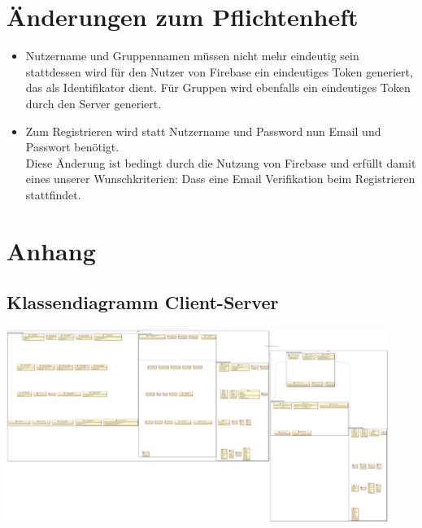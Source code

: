 \documentclass[a4paper]{scrreprt}
\begin{document}
\chapter{Änderungen zum Pflichtenheft}
\begin{itemize}
	\item Nutzername und Gruppennamen müssen nicht mehr eindeutig sein \\
	stattdessen wird für den Nutzer von Firebase ein eindeutiges Token generiert, das als Identifikator dient. Für Gruppen wird ebenfalls ein eindeutiges Token durch den Server generiert.
	\item Zum Registrieren wird statt Nutzername und Password nun Email und Passwort benötigt. \\Diese Änderung ist bedingt durch die Nutzung von Firebase und erfüllt damit eines unserer Wunschkriterien: Dass eine Email Verifikation beim Registrieren stattfindet. 
\end{itemize}

\printglossaries

\chapter{Anhang}
\section{Klassendiagramm Client-Server}
\begin{center}
	\includegraphics[width=0.93\textwidth]{Klassendiagramme/client_server.png}
\end{center}
\end{document}

